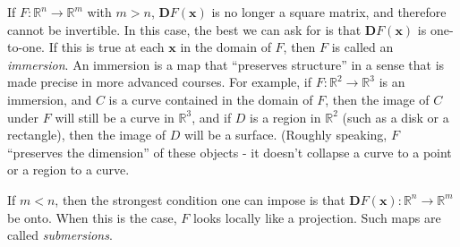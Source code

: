 \documentclass[12pt,letterpaper]{article}
\newcommand{\R}{\mathbb{R}}
\newcommand{\D}{\mathbf{D}}
\newcommand{\x}{\mathbf{x}}
\begin{document}
If $F:\R^n\to \R^m$ with $m>n$, $\D F(\x)$ is no longer a square matrix, and therefore cannot be invertible. In this case, the best we can ask for is that $\D F(\x)$ is one-to-one. If this is true at each $\x$ in the domain of $F$, then $F$ is called an {\em immersion}. An immersion is a map that ``preserves structure'' in a sense that is made precise in more advanced courses. For example, if $F:\R^2\to \R^3$ is an immersion, and $C$ is a curve contained in the domain of $F$, then the image of $C$ under $F$ will still be a curve in $\R^3$, and if $D$ is a region in $\R^2$ (such as a disk or a rectangle), then the image of $D$ will be a surface. (Roughly speaking, $F$ ``preserves the dimension'' of these objects - it doesn't collapse a curve to a point or a region to a curve.

If $m<n$, then the strongest condition one can impose is that $\D F(\x):\R^n\to \R^m$ be onto. When this is the case, $F$ looks locally like a projection. Such maps are called {\em submersions}. 
\end{document}
